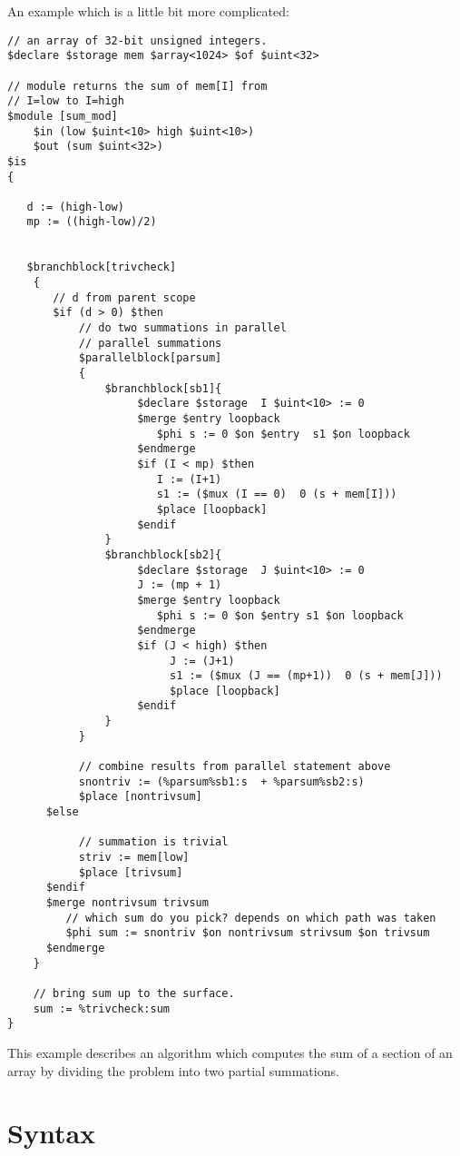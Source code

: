 \documentclass{article}
\begin{document}
An example which is a little bit more complicated:
\begin{verbatim}
// an array of 32-bit unsigned integers.
$declare $storage mem $array<1024> $of $uint<32> 

// module returns the sum of mem[I] from
// I=low to I=high
$module [sum_mod]
    $in (low $uint<10> high $uint<10>)
    $out (sum $uint<32>)
$is
{
 
   d := (high-low)  
   mp := ((high-low)/2)


   $branchblock[trivcheck]
    {
       // d from parent scope
       $if (d > 0) $then  
           // do two summations in parallel
           // parallel summations
           $parallelblock[parsum]
           {
               $branchblock[sb1]{
                    $declare $storage  I $uint<10> := 0
                    $merge $entry loopback
                       $phi s := 0 $on $entry  s1 $on loopback
                    $endmerge
                    $if (I < mp) $then
                       I := (I+1)
                       s1 := ($mux (I == 0)  0 (s + mem[I]))
                       $place [loopback]
                    $endif
               } 
               $branchblock[sb2]{
                    $declare $storage  J $uint<10> := 0
                    J := (mp + 1)
                    $merge $entry loopback
                       $phi s := 0 $on $entry s1 $on loopback
                    $endmerge
                    $if (J < high) $then
                         J := (J+1)
                         s1 := ($mux (J == (mp+1))  0 (s + mem[J]))
                         $place [loopback]
                    $endif
               } 
           }
 
           // combine results from parallel statement above
           snontriv := (%parsum%sb1:s  + %parsum%sb2:s)
           $place [nontrivsum]
      $else

           // summation is trivial 
           striv := mem[low]
           $place [trivsum]
      $endif
      $merge nontrivsum trivsum
         // which sum do you pick? depends on which path was taken
         $phi sum := snontriv $on nontrivsum strivsum $on trivsum
      $endmerge
    }

    // bring sum up to the surface.
    sum := %trivcheck:sum
}
\end{verbatim}
This example describes an algorithm which computes the sum of
a section of an array by dividing the problem into two partial
summations. 

\section{Syntax} \label{sec:Syntax}
\end{document}
